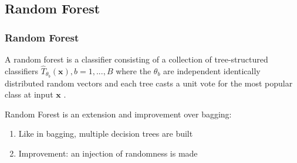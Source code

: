 \subsection{Random Forest}

\begin{frame}
\frametitle{Random Forest}


\vspace{1ex}


\begin{definition}[by L.Breiman]
	A random forest is a classifier consisting of a collection of tree-structured classifiers ${\hat{T}_{\theta_{b}}(\textbf{x})}, b = 1,...,B$ where the $\theta_{b}$ are independent identically
	distributed random vectors and each tree casts a unit vote for the most popular class at input $\textbf{x}$ .
\end{definition}
\vspace{4ex}

Random Forest is an extension and improvement over bagging:
\vspace{1ex}
\begin{enumerate}
\item Like in bagging, multiple decision trees are built
\vspace{1ex}
\item Improvement: an injection of randomness is made
\end{enumerate}

\end{frame}


